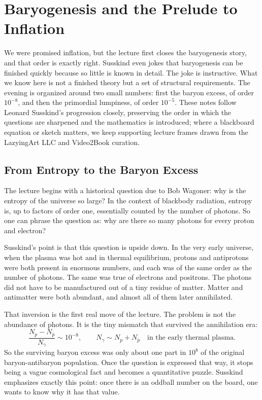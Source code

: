 \chapter{Baryogenesis and the Prelude to Inflation}

We were promised inflation, but the lecture first closes the baryogenesis story, and that order is exactly right. Susskind even jokes that baryogenesis can be finished quickly because so little is known in detail. The joke is instructive. What we know here is not a finished theory but a set of structural requirements. The evening is organized around two small numbers: first the baryon excess, of order \(10^{-8}\), and then the primordial lumpiness, of order \(10^{-5}\). These notes follow Leonard Susskind's progression closely, preserving the order in which the questions are sharpened and the mathematics is introduced; where a blackboard equation or sketch matters, we keep supporting lecture frames drawn from the LazyingArt LLC and Video2Book curation.

\section{From Entropy to the Baryon Excess}

The lecture begins with a historical question due to Bob Wagoner: why is the entropy of the universe so large? In the context of blackbody radiation, entropy is, up to factors of order one, essentially counted by the number of photons. So one can phrase the question as: why are there so many photons for every proton and electron?

Susskind's point is that this question is upside down. In the very early universe, when the plasma was hot and in thermal equilibrium, protons and antiprotons were both present in enormous numbers, and each was of the same order as the number of photons. The same was true of electrons and positrons. The photons did not have to be manufactured out of a tiny residue of matter. Matter and antimatter were both abundant, and almost all of them later annihilated.

That inversion is the first real move of the lecture. The problem is not the abundance of photons. It is the tiny mismatch that survived the annihilation era:
\begin{equation}
\frac{N_p-N_{\bar p}}{N_\gamma}\sim 10^{-8},
\qquad
N_\gamma \sim N_p+N_{\bar p}
\quad
\text{in the early thermal plasma.}
\end{equation}
So the surviving baryon excess was only about one part in \(10^8\) of the original baryon-antibaryon population.
Once the question is expressed that way, it stops being a vague cosmological fact and becomes a quantitative puzzle.
Susskind emphasizes exactly this point: once there is an oddball number on the board, one wants to know why it has that value.

